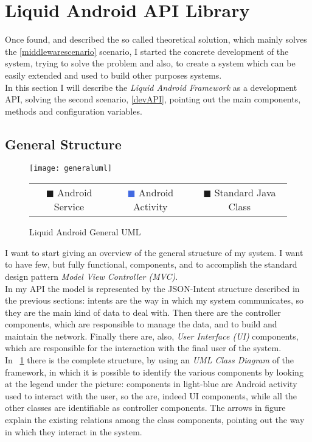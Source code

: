 \section{Liquid Android API Library}\label{API}
Once found, and described the so called theoretical solution, which mainly solves the \ref{middlewarescenario} scenario, I started the concrete development of the system, trying to solve the problem and also, to create a system which can be easily extended and used to build other purposes systems.\\
In this section I will describe the \textit{Liquid Android Framework} as a development API, solving the second scenario, \ref{devAPI}, pointing out the main components, methods and configuration variables.
\subsection{General Structure}
\begin{figure}[h!]
	\centering
	\texttt{[image: generaluml]}
	\caption{Liquid Android General UML}
	\label{fig:4.7}
	\begin{tabular}{ccc}
		\textcolor{OliveGreen}{$\blacksquare$} Android Service & \textcolor{RoyalBlue}{$\blacksquare$} Android Activity & \textcolor{RoyalPurple}{$\blacksquare$} Standard Java Class\\
	\end{tabular}
\end{figure}
I want to start giving an overview of the general structure of my system. I want to have few, but fully functional, components, and to accomplish the standard design pattern \textit{Model View Controller (MVC)}.\\
In my API the model is represented by the JSON-Intent structure described in the previous sections: intents are the way in which my system communicates, so they are the main kind of data to deal with. Then there are the controller components, which are responsible to manage the data, and to build and maintain the network. Finally there are, also, \textit{User Interface (UI)} components, which are responsible for the interaction with the final user of the system.\\
In \figurename~\ref{fig:4.7} there is the complete structure, by using an \textit{UML Class Diagram} of the framework, in which it is possible to identify the various components by looking at the legend under the picture: components in light-blue are Android activity used to interact with the user, so the are, indeed UI components, while all the other classes are identifiable as controller components. The arrows in figure explain the existing relations among the class components, pointing out the way in which they interact in the system.
